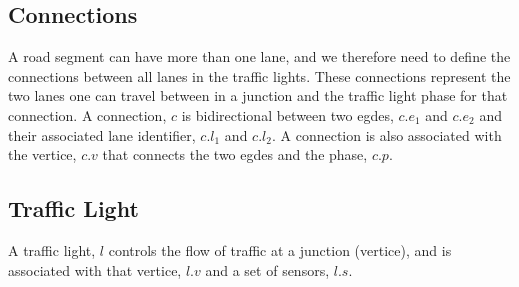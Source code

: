 \subsection{Connections}
A road segment can have more than one lane, and we therefore need to define the connections between all lanes in the traffic lights.
These connections represent the two lanes one can travel between in a junction and the traffic light phase for that connection.
A connection, $c$ is bidirectional between two egdes, $c.e_1$ and $c.e_2$ and their associated lane identifier, $c.l_1$ and $c.l_2$. A connection is also associated with the vertice, $c.v$ that connects the two egdes and the phase, $c.p$.

\begin{comment}
In addition to egdes and vertices, we define et set of connections between two egdes. These connections represent the two lanes one can travel between in a junction. Each connection has a phase of traffic light settings.Lanes are indexed from $0$, and the set of connections is defined as
\[
\mathcal{C}_{(V, E)} = \{(e_1, l_1, e_2, l_2, p) \mid e_1, e_2 \in E, l_1, l_2\in \mathbb{N}_0, p\in \mathcal{P}\}
\]
We assume that $e_1$ and $e_2$ are connected in $(V, E)$.
\end{comment}

\subsection{Traffic Light}
A traffic light, $l$ controls the flow of traffic at a junction (vertice), and is associated with that vertice, $l.v$ and a set of sensors, $l.s$.

\begin{comment}
Now, we can describe the set of traffic lights as a triple of a vertice, a set of connections with a phase and a set of sensors.
\[
\mathcal{L}_{(V,E)} = \{(v, c, s)\mid v\in V, c\subseteq \mathcal{C}_{(V,E)}, s\in \mathcal{S}\}
\]
\end{comment}





